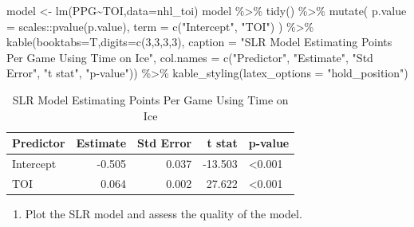 \documentclass[
  11pt,
]{book}
\newenvironment{Shaded}{\begin{snugshade}}{\end{snugshade}}
\newcommand{\AttributeTok}[1]{\textcolor[rgb]{0.77,0.63,0.00}{#1}}
\newcommand{\DecValTok}[1]{\textcolor[rgb]{0.00,0.00,0.81}{#1}}
\newcommand{\FunctionTok}[1]{\textcolor[rgb]{0.00,0.00,0.00}{#1}}
\newcommand{\NormalTok}[1]{#1}
\newcommand{\OtherTok}[1]{\textcolor[rgb]{0.56,0.35,0.01}{#1}}
\newcommand{\SpecialCharTok}[1]{\textcolor[rgb]{0.00,0.00,0.00}{#1}}
\newcommand{\StringTok}[1]{\textcolor[rgb]{0.31,0.60,0.02}{#1}}
\providecommand{\tightlist}{%
  \setlength{\itemsep}{0pt}\setlength{\parskip}{0pt}}
\theoremstyle{definition}
\theoremstyle{definition}
\theoremstyle{definition}
\theoremstyle{definition}
\theoremstyle{remark}
\begin{document}
\begin{Shaded}
\begin{Highlighting}[]
\NormalTok{model }\OtherTok{\textless{}{-}} \FunctionTok{lm}\NormalTok{(PPG}\SpecialCharTok{\textasciitilde{}}\NormalTok{TOI,}\AttributeTok{data=}\NormalTok{nhl\_toi)}
\NormalTok{model }\SpecialCharTok{\%\textgreater{}\%} \FunctionTok{tidy}\NormalTok{() }\SpecialCharTok{\%\textgreater{}\%}
  \FunctionTok{mutate}\NormalTok{(}
    \AttributeTok{p.value =}\NormalTok{ scales}\SpecialCharTok{::}\FunctionTok{pvalue}\NormalTok{(p.value),}
    \AttributeTok{term =} \FunctionTok{c}\NormalTok{(}\StringTok{"Intercept"}\NormalTok{, }\StringTok{"TOI"}\NormalTok{)}
\NormalTok{  ) }\SpecialCharTok{\%\textgreater{}\%}
  \FunctionTok{kable}\NormalTok{(}\AttributeTok{booktabs=}\NormalTok{T,}\AttributeTok{digits=}\FunctionTok{c}\NormalTok{(}\DecValTok{3}\NormalTok{,}\DecValTok{3}\NormalTok{,}\DecValTok{3}\NormalTok{,}\DecValTok{3}\NormalTok{), }
        \AttributeTok{caption =} \StringTok{"SLR Model Estimating Points Per Game Using Time on Ice"}\NormalTok{,}
        \AttributeTok{col.names =} \FunctionTok{c}\NormalTok{(}\StringTok{"Predictor"}\NormalTok{, }\StringTok{"Estimate"}\NormalTok{, }\StringTok{"Std Error"}\NormalTok{, }\StringTok{"t stat"}\NormalTok{, }\StringTok{"p{-}value"}\NormalTok{)) }\SpecialCharTok{\%\textgreater{}\%}
  \FunctionTok{kable\_styling}\NormalTok{(}\AttributeTok{latex\_options =} \StringTok{"hold\_position"}\NormalTok{)}
\end{Highlighting}
\end{Shaded}

\begin{table}[!h]

\caption{\label{tab:unnamed-chunk-211}SLR Model Estimating Points Per Game Using Time on Ice}
\centering
\begin{tabular}[t]{lrrrl}
\toprule
Predictor & Estimate & Std Error & t stat & p-value\\
\midrule
Intercept & -0.505 & 0.037 & -13.503 & <0.001\\
TOI & 0.064 & 0.002 & 27.622 & <0.001\\
\bottomrule
\end{tabular}
\end{table}

\newpage

\begin{enumerate}
\def\labelenumi{(\alph{enumi})}
\setcounter{enumi}{2}
\tightlist
\item
  Plot the SLR model and assess the quality of the model.
\end{enumerate}
\end{document}
